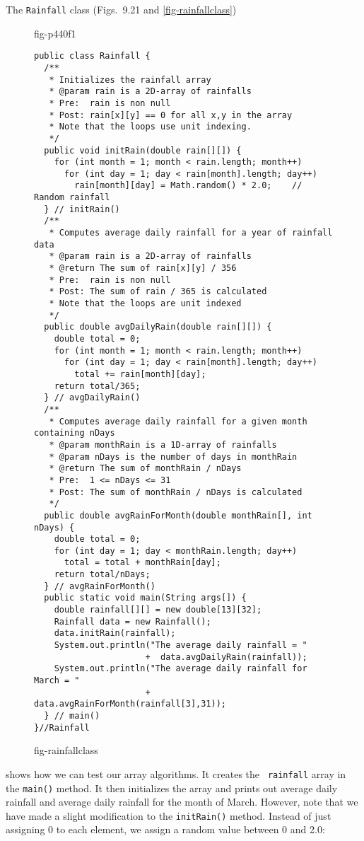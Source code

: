 \noindent The {\tt Rainfall} class (Figs.~9.21 and \ref{fig-rainfallclass})
\begin{figure}[htb]
{fig-p440f1}
\end{figure}
\begin{figure}[p!]
\jjjprogstart
\begin{jjjlisting}[32pc]
\begin{lstlisting}
public class Rainfall {
  /**
   * Initializes the rainfall array
   * @param rain is a 2D-array of rainfalls
   * Pre:  rain is non null
   * Post: rain[x][y] == 0 for all x,y in the array
   * Note that the loops use unit indexing.
   */
  public void initRain(double rain[][]) {
    for (int month = 1; month < rain.length; month++)
      for (int day = 1; day < rain[month].length; day++)
        rain[month][day] = Math.random() * 2.0;    // Random rainfall
  } // initRain()
  /**
   * Computes average daily rainfall for a year of rainfall data
   * @param rain is a 2D-array of rainfalls
   * @return The sum of rain[x][y] / 356
   * Pre:  rain is non null
   * Post: The sum of rain / 365 is calculated
   * Note that the loops are unit indexed
   */
  public double avgDailyRain(double rain[][]) {
    double total = 0;
    for (int month = 1; month < rain.length; month++)
      for (int day = 1; day < rain[month].length; day++)
        total += rain[month][day];
    return total/365;
  } // avgDailyRain()
  /**
   * Computes average daily rainfall for a given month containing nDays
   * @param monthRain is a 1D-array of rainfalls
   * @param nDays is the number of days in monthRain
   * @return The sum of monthRain / nDays
   * Pre:  1 <= nDays <= 31
   * Post: The sum of monthRain / nDays is calculated
   */
  public double avgRainForMonth(double monthRain[], int nDays) {
    double total = 0;
    for (int day = 1; day < monthRain.length; day++)
      total = total + monthRain[day];
    return total/nDays;
  } // avgRainForMonth()
  public static void main(String args[]) {
    double rainfall[][] = new double[13][32];
    Rainfall data = new Rainfall();
    data.initRain(rainfall);
    System.out.println("The average daily rainfall = " 
                      +  data.avgDailyRain(rainfall));
    System.out.println("The average daily rainfall for March = " 
                      +  data.avgRainForMonth(rainfall[3],31));
  } // main()
}//Rainfall
\end{lstlisting}
\end{jjjlisting}
{fig-rainfallclass}
\end{figure}
shows how we can test our array algorithms.  It creates the {\tt
rainfall} array in the {\tt main()} method.  It then initializes the
array and prints out average daily rainfall and average daily rainfall
for the month of March.  However, note that we have made a slight
modification to the {\tt initRain()} method.  Instead of just
assigning 0 to each element, we assign a random value between 0 and
2.0:


